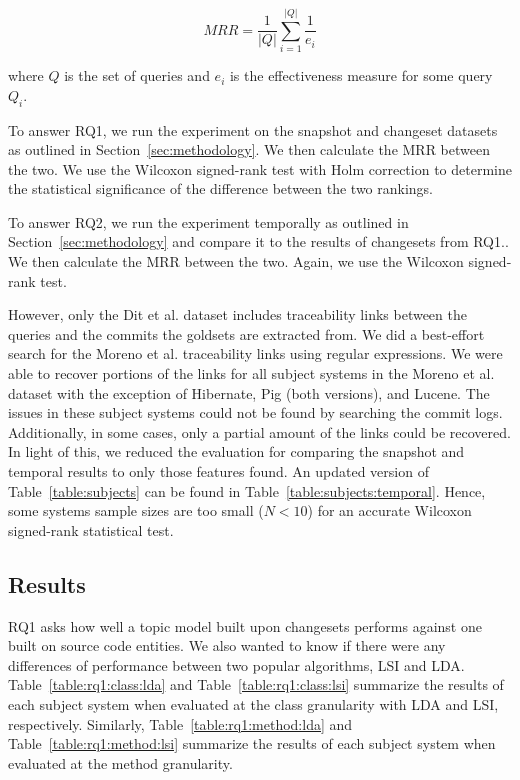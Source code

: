 \begin{equation}
    MRR = \frac{1}{|Q|} \sum_{i=1}^{|Q|} \frac{1}{e_i}
\end{equation}

where $Q$ is the set of queries
and $e_i$ is the effectiveness measure for some query $Q_i$.

To answer RQ1, we run the experiment on the snapshot and changeset
datasets as outlined in Section~\ref{sec:methodology}.
We then calculate the MRR between the two.
We use the Wilcoxon signed-rank test with Holm correction to determine
the statistical significance of the difference between the two rankings.

To answer RQ2, we run the experiment temporally as outlined in
Section~\ref{sec:methodology} and compare it to the results of changesets from
RQ1..  We then calculate the MRR between the two.  Again, we use the Wilcoxon
signed-rank test.

However, only the Dit et al. dataset includes traceability links between the
queries and the commits the goldsets are extracted from.  We did a best-effort
search for the Moreno et al. traceability links using regular expressions.  We
were able to recover portions of the links for all subject systems in the
Moreno et al. dataset with the exception of Hibernate, Pig (both versions), and
Lucene.  The issues in these subject systems could not be found by searching
the commit logs.  Additionally, in some cases, only a partial amount of the
links could be recovered. In light of this, we reduced the evaluation for
comparing the snapshot and temporal results to only those features found.  An
updated version of Table~\ref{table:subjects} can be found in
Table~\ref{table:subjects:temporal}.  Hence, some systems sample sizes are too
small ($N<10$) for an accurate Wilcoxon signed-rank statistical test.




\subsection{Results}







RQ1 asks how well a topic model built upon changesets performs against one
built on source code entities.  We also wanted to know if there were any
differences of performance between two popular algorithms, LSI and LDA.
Table~\ref{table:rq1:class:lda} and Table~\ref{table:rq1:class:lsi} summarize
the results of each subject system when evaluated at the class granularity with
LDA and LSI, respectively.  Similarly, Table~\ref{table:rq1:method:lda} and
Table~\ref{table:rq1:method:lsi} summarize the results of each subject system
when evaluated at the method granularity.

